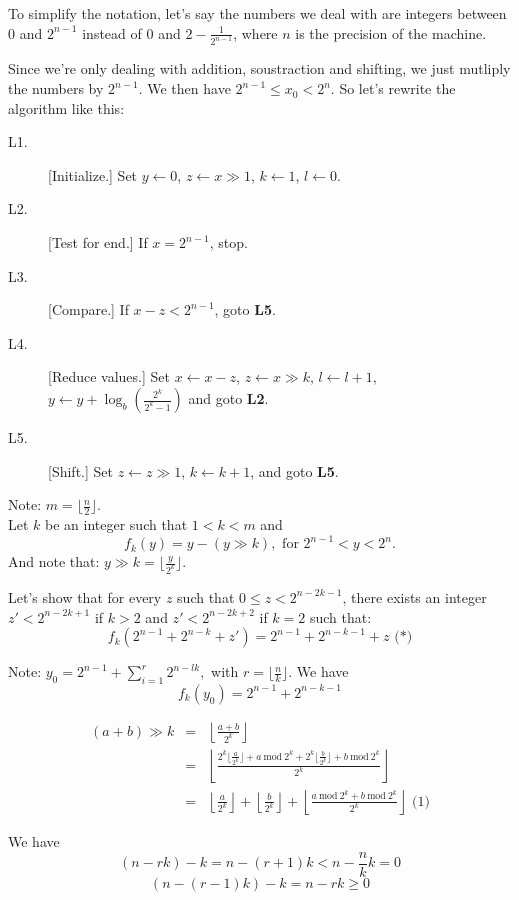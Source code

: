 \documentclass[a4paper,12pt]{article}
\newcommand{\la}{\leftarrow}
\begin{document}
To simplify the notation, let's say the numbers we deal with are integers
between $0$ and $2^{n-1}$ instead of $0$ and $2 - \frac{1}{2^{n-1}}$, where
$n$ is the precision of the machine.


Since we're only dealing with addition, soustraction and shifting, we just
mutliply the numbers by $2^{n-1}$.  We then have $2^{n-1} \le x_0 < 2^n$.
So let's rewrite the algorithm like this:
\begin{description}
\item[L1.]
[Initialize.] Set $y \la 0$, $z \la x \gg 1$,
$k \la 1$, $l \la 0$.
\item[L2.]
[Test for end.] If $x = 2^{n-1}$, stop.
\item[L3.]
[Compare.] If $x - z < 2^{n-1}$, goto \textbf{L5}.
\item[L4.]
[Reduce values.] Set $x \la x-z$, $z \la x \gg k$,
$l \la l+1$,
$y \la y + \log_b\left(\frac{2^k}{2^k-1}\right)$ and goto \textbf{L2}.
\item[L5.]
[Shift.] Set $z \la z \gg 1$, $k \la k+1$, and goto \textbf{L5}.
\end{description}
Note: $m = \lfloor \frac{n}{2}\rfloor$.\\
Let $k$ be an integer such that $1 < k < m$ and
\[f_k(y) = y - (y \gg k), \mbox{ for } 2^{n-1} < y < 2^{n}.\]
And note that: $y \gg k = \lfloor \frac{y}{2^k}\rfloor$.

\medskip
Let's show that for every $z$ such that $0 \le z < 2^{n-2k-1}$, there exists an
integer $z' < 2^{n-2k+1}$ if $k > 2$ and $z'<2^{n-2k+2}$ if $k=2$ such that:
\[ f_k(2^{n-1} + 2^{n-k} + z') = 2^{n-1} + 2^{n-k-1} + z \mbox{ (*)}\]

Note: $y_0 = 2^{n-1} + \sum_{i=1}^r 2^{n-lk},$ with 
$r=\lfloor \frac{n}{k}\rfloor$.  We have 
\[f_k(y_0) = 2^{n-1} + 2^{n-k-1}\]

\begin{eqnarray*}
(a+b) \gg k & = & \left\lfloor \frac{a+b}{2^k}\right\rfloor\\ & = &
\left\lfloor \frac{2^k\lfloor\frac{a}{2^k}\rfloor + a\ \mathrm{mod}\ 2^k + 
2^k\lfloor\frac{b}{2^k}\rfloor + b\ \mathrm{mod}\ 2^k}{2^k}\right\rfloor\\ &=&
\left\lfloor\frac{a}{2^k}\right\rfloor + 
\left\lfloor\frac{b}{2^k}\right\rfloor +
\left\lfloor\frac{a\ \mathrm{mod}\ 2^k + b\ \mathrm{mod}\ 2^k}{2^k}\right\rfloor
\mbox{ (1)}
\end{eqnarray*}

We have
\[ (n-rk) - k = n - (r+1)k < n - \frac{n}{k} k = 0\]
\[ (n - (r-1)k) - k = n - rk \ge 0 \]
\end{document}
